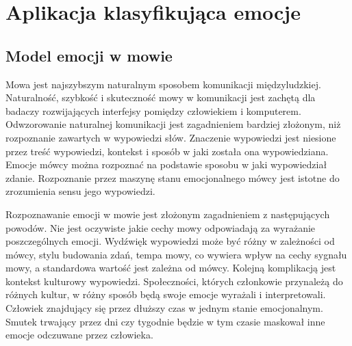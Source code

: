 \documentclass[a4paper,12pt,twoside,openany]{report}
\newcommand*\NewPage{\newpage\null\thispagestyle{empty}\newpage}
\begin{document}
\NewPage
\chapter{Aplikacja klasyfikująca emocje}
\section{Model emocji w mowie}
Mowa jest najszybszym naturalnym sposobem komunikacji międzyludzkiej.
Naturalność, szybkość i skuteczność mowy w komunikacji jest zachętą dla badaczy rozwijających interfejsy pomiędzy człowiekiem i komputerem. 
Odwzorowanie naturalnej komunikacji jest zagadnieniem bardziej złożonym, niż rozpoznanie zawartych w wypowiedzi słów.
Znaczenie wypowiedzi jest niesione przez treść wypowiedzi, kontekst i sposób w jaki została ona wypowiedziana.
Emocje mówcy można rozpoznać na podstawie sposobu w jaki wypowiedział zdanie.
Rozpoznanie przez maszynę stanu emocjonalnego mówcy jest istotne do zrozumienia sensu jego wypowiedzi.

Rozpoznawanie emocji w mowie jest złożonym zagadnieniem z następujących powodów.
Nie jest oczywiste jakie cechy mowy odpowiadają za wyrażanie poszczególnych emocji.
Wydźwięk wypowiedzi może być różny w zależności od mówcy, stylu budowania zdań, tempa mowy, co wywiera wpływ na cechy sygnału mowy, a standardowa wartość jest zależna od mówcy.
Kolejną komplikacją jest kontekst kulturowy wypowiedzi. 
Społeczności, których członkowie przynależą do różnych kultur, w różny sposób będą swoje emocje wyrażali i interpretowali.
Człowiek znajdujący się przez dłuższy czas w jednym stanie emocjonalnym.
Smutek trwający przez dni czy tygodnie będzie w tym czasie maskował inne emocje odczuwane przez człowieka.
\end{document}
